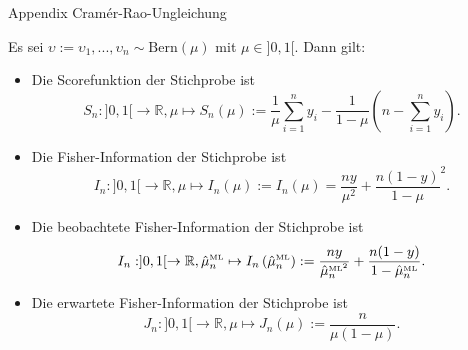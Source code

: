 \documentclass[
  8pt,
  ignorenonframetext,
]{beamer}
\newcommand{\ups} {\upsilon}
\begin{document}
\begin{frame}{Appendix \textbar{} Cramér-Rao-Ungleichung}
\protect\hypertarget{appendix-cramuxe9r-rao-ungleichung-8}{}
\footnotesize
\begin{theorem}
\normalfont
\justifying
Es sei $\ups := \ups_1,...,\ups_n \sim \mbox{Bern}(\mu)$ mit $\mu \in ]0,1[$. Dann gilt:
\vspace{1mm}
\begin{itemize}
\item Die Scorefunktion der Stichprobe ist
\begin{equation}
S_n : ]0,1[ \to \mathbb{R}, \mu \mapsto S_n(\mu) :=
\frac{1}{\mu}\sum_{i=1}^n y_i  -  \frac{1}{1-\mu} \left(n - \sum_{i=1}^n y_i \right).
\end{equation}
\item Die Fisher-Information der Stichprobe ist
\begin{equation}
I_n : ]0,1[ \to \mathbb{R}, \mu \mapsto I_n(\mu) :=
I_n(\mu) =  \frac{ny}{\mu^2} + \frac{n(1 - y)}{1-\mu}^{2}.
\end{equation}
\item Die beobachtete Fisher-Information der Stichprobe ist
\begin{equation}
I_n : ]0,1[ \to \mathbb{R}, \hat{\mu}_{n}^{\mbox{\tiny ML}} \mapsto
I_n\left(\hat{\mu}_{n}^{\mbox{\tiny ML}}\right)
:= \frac{ny}{\hat{\mu}_{n}^{{\mbox{\tiny ML}}^2}} + \frac{n(1 - y)}{1-\hat{\mu}_{n}^{\mbox{\tiny ML}}}.
\end{equation}
\item Die erwartete Fisher-Information der Stichprobe ist
\begin{equation}
J_n : ]0,1[ \to \mathbb{R}, \mu \mapsto J_n(\mu)
:= \frac{n}{\mu(1-\mu)}.
\end{equation}
\end{itemize}
\end{theorem}
\end{frame}
\end{document}
